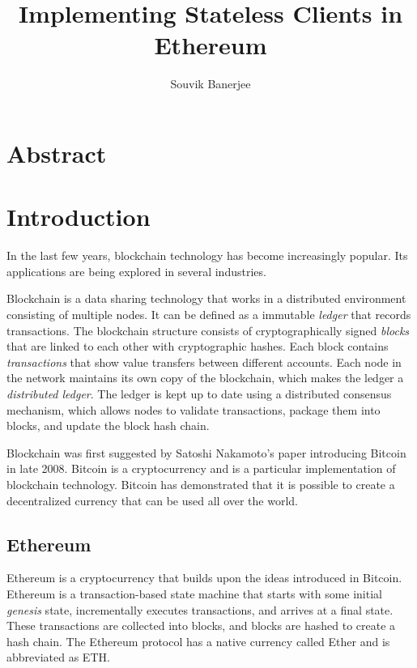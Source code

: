 \documentclass[12pt]{article}
\title{Implementing Stateless Clients in Ethereum}
\author{Souvik Banerjee}
\date{}
\begin{document}
\maketitle

\section{Abstract}

\section{Introduction}

In the last few years, blockchain technology has become increasingly popular. Its applications are being explored in several industries.

Blockchain is a data sharing technology that works in a distributed environment consisting of multiple nodes. It can be defined as a immutable \emph{ledger} that records transactions. The blockchain structure consists of cryptographically signed \emph{blocks} that are linked to each other with cryptographic hashes. Each block contains \emph{transactions} that show value transfers between different accounts. Each node in the network maintains its own copy of the blockchain, which makes the ledger a \emph{distributed ledger}. The ledger is kept up to date using a distributed consensus mechanism, which allows nodes to validate transactions, package them into blocks, and update the block hash chain.

Blockchain was first suggested by Satoshi Nakamoto's paper introducing Bitcoin in late 2008. Bitcoin is a cryptocurrency and is a particular implementation of blockchain technology. Bitcoin has demonstrated that it is possible to create a decentralized currency that can be used all over the world.

\subsection{Ethereum}

Ethereum is a cryptocurrency that builds upon the ideas introduced in Bitcoin. Ethereum is a transaction-based state machine that starts with some initial \emph{genesis} state, incrementally executes transactions, and arrives at a final state. These transactions are collected into blocks, and blocks are hashed to create a hash chain. The Ethereum protocol has a native currency called Ether and is abbreviated as ETH.
\end{document}
